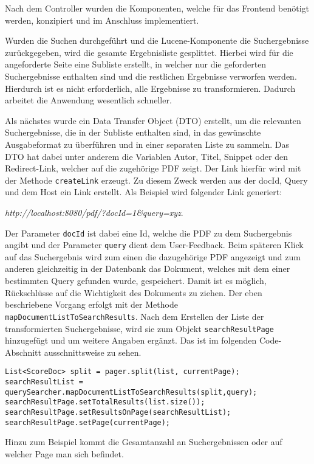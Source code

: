 
Nach dem Controller wurden die Komponenten, welche für das Frontend benötigt werden, konzipiert und im Anschluss implementiert. 

Wurden die Suchen durchgeführt und die Lucene-Komponente die Suchergebnisse zurückgegeben, wird die gesamte Ergebnisliste gesplittet.
Hierbei wird für die angeforderte Seite eine Subliste erstellt, in welcher nur die geforderten Suchergebnisse enthalten sind und die restlichen Ergebnisse verworfen werden.
Hierdurch ist es nicht erforderlich, alle Ergebnisse zu transformieren.
Dadurch arbeitet die Anwendung wesentlich schneller.

Als nächstes wurde ein Data Transfer Object (DTO) erstellt, um die relevanten Suchergebnisse, die in der Subliste enthalten sind, in das gewünschte Ausgabeformat zu überführen und in einer separaten  Liste zu sammeln.
Das DTO hat dabei unter anderem die Variablen Autor, Titel, Snippet oder den Redirect-Link, welcher auf die zugehörige PDF zeigt.   
Der Link hierfür wird mit der Methode \texttt{createLink} erzeugt.
Zu diesem Zweck werden aus der docId, Query und dem Host ein Link erstellt. 
Als Beispiel wird folgender Link generiert:

\textit{http://localhost:8080/pdf/?docId=1\&query=xyz}.

Der Parameter \texttt{docId} ist dabei eine Id, welche die PDF zu dem Suchergebnis angibt und der Parameter \texttt{query} dient dem User-Feedback.
Beim späteren Klick auf das Suchergebnis wird zum einen die dazugehörige PDF angezeigt und zum anderen gleichzeitig in der Datenbank das Dokument, welches mit dem einer bestimmten Query gefunden wurde, gespeichert.
Damit ist es möglich, Rückschlüsse auf die Wichtigkeit des Dokuments zu ziehen.
Der eben beschriebene Vorgang erfolgt mit der Methode \texttt{mapDocumentListToSearchResults}.
Nach dem Erstellen der Liste der transformierten Suchergebnisse, wird sie zum Objekt \texttt{searchResultPage} hinzugefügt und um weitere Angaben ergänzt.
Das ist im folgenden Code-Abschnitt ausschnittsweise zu sehen.
\pagebreak

\begin{lstlisting}
List<ScoreDoc> split = pager.split(list, currentPage);
searchResultList = querySearcher.mapDocumentListToSearchResults(split,query);
searchResultPage.setTotalResults(list.size());
searchResultPage.setResultsOnPage(searchResultList);
searchResultPage.setPage(currentPage);
\end{lstlisting}

Hinzu zum Beispiel kommt die Gesamtanzahl an Suchergebnissen oder auf welcher Page man sich befindet.


